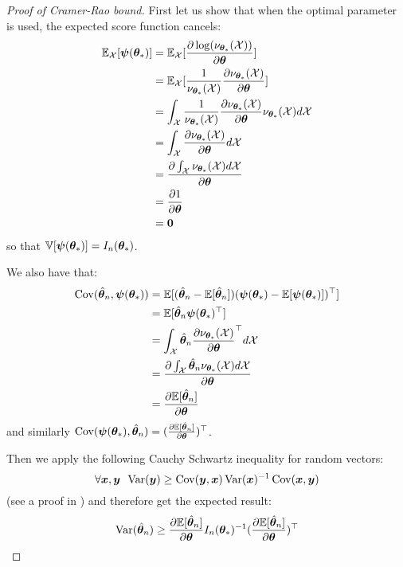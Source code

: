 \begin{proof}[Proof of Cramer-Rao bound]
  First let us show that when the optimal parameter is used, the expected score
  function cancels:
  \begin{align}
    \EE_{\Xcal}[\psib(\thetab_*)] 
    &= \EE_{\Xcal}[\partialfrac{\thetab}{\log(\nu_{\thetab_*}(\Xcal))}] \\
    &= \EE_{\Xcal}[\frac1{\nu_{\thetab_*}(\Xcal)}\partialfrac{\thetab}{\nu_{\thetab_*}(\Xcal)}] \\
    &= \int_{\Xcal} \frac1{\nu_{\thetab_*}(\Xcal)}\partialfrac{\thetab}{\nu_{\thetab_*}(\Xcal)} \nu_{\thetab_*}(\Xcal) d\Xcal \\
    &= \int_{\Xcal} \partialfrac{\thetab}{\nu_{\thetab_*}(\Xcal)} d\Xcal \\
    &= \partialfrac{\thetab}{\int_{\Xcal} \nu_{\thetab_*}(\Xcal)d\Xcal}  \\
    &= \partialfrac{\thetab}{1} \\
    &= \bzero
  \end{align}
  so that $\VV[\psib(\thetab_*)] = I_n(\thetab_*)$.

  We also have that:
  \begin{align}
    \Cov(\hat{\thetab}_n, \psib(\thetab_*)) &= \EE[ (\hat{\thetab}_n - \EE[\hat{\thetab}_n]) (\psib(\thetab_*) -  \EE[\psib(\thetab_*)])^{\top}]\\
                                           &= \EE[ \hat{\thetab}_n \psib(\thetab_*)^{\top}]\\
                                           &= \int_{\Xcal} \hat{\thetab}_n \partialfrac{\thetab}{\nu_{\thetab_*}(\Xcal)}^{\top} d\Xcal \\
                                           &= \partialfrac{\thetab}{\int_{\Xcal} \hat{\thetab}_n \nu_{\thetab_*}(\Xcal) d\Xcal} \\
                                           &= \partialfrac{\thetab}{\EE[\hat{\thetab}_n]}
  \end{align}
  and similarly $\Cov(\psib(\thetab_*), \hat{\thetab}_n) = (\partialfrac{\thetab}{\EE[\hat{\thetab}_n]})^{\top}$.

  Then we apply the following Cauchy Schwartz inequality for random vectors:
  \begin{equation}
  \forall \xb, \yb \enspace \Var(\yb) \geq  \Cov(\yb, \xb) \Var(\xb)^{-1} \Cov(\xb, \yb)
  \end{equation}
(see a proof in \cite{tripathi1999matrix})
and therefore get the expected result:
  \begin{align}
    \Var(\hat{\thetab}_n) \geq  \partialfrac{\thetab}{\EE[\hat{\thetab}_n]} I_n(\thetab_*)^{-1} (\partialfrac{\thetab}{\EE[\hat{\thetab}_n]})^{\top} 
  \end{align}
\end{proof}

